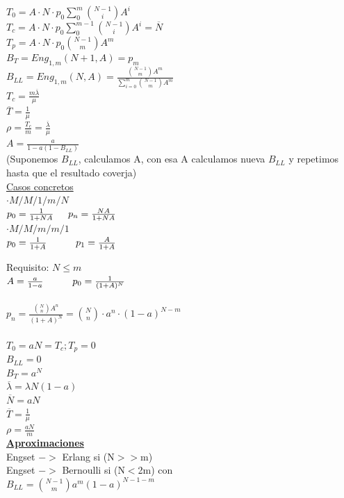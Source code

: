 \vfill\null
\columnbreak

\begin{minipage}{.22\textwidth}
	$T_0={A}\cdot{N}\cdot{p_0}\sum_0^m{\binom{N-1}{i}A^i}$ \\
	$T_c={A}\cdot{N}\cdot{p_0}\sum_0^{m-1}{\binom{N-1}{i}A^i}=\overline{N}$ \\
	$T_p={A}\cdot{N}\cdot{p_0}{\binom{N-1}{m}A^m}$ \\
	$B_{T}=Eng_{1,m}(N+1,A)=p_m$ \\
	$B_{LL}=Eng_{1,m}(N,A)=\frac{\binom{N-1}{m}A^m}{\sum\limits_{i=0}^m{\binom{N-1}{m}A^m}}$ \\
	$T_c=\frac{m{\overline{\lambda}}}{\mu}$ \\
	$\overline{T}=\frac{1}{\mu}$ \\
	$\rho=\frac{T_c}{m}=\frac{\overline{\lambda}}{\mu}$ \\
	$A=\frac{a}{1-a(1-B_{LL})}$ \\
	(Suponemos $B_{LL}$, calculamos A, con esa A calculamos nueva $B_{LL}$ y repetimos hasta que el resultado coverja) \\
	{\underline{Casos concretos}} \\
	$\cdot M/M/1/m/N$ \\
	$p_0=\frac{1}{1+NA} \hskip 1.5em p_n=\frac{NA}{1+NA}$ \\
	$\cdot M/M/m/m/1$ \\
	$p_0 = \frac{1}{1+A} \hskip 3em p_1=\frac{A}{1+A}$ \\
\end{minipage}

\begin{minipage}{.22\textwidth}
	Requisito: $N\le{m}$ \\
	$A=\frac{a}{1-a} \hskip 3em {p_0}=\frac{1}{(1+A)^N}$ \\ \\
	$p_n=\frac{\binom{N}{n}{A^n}}{(1+A)^N}=\binom{N}{n}\cdot{a^n}\cdot{(1-a)^{N-m}}$ \\ \\
	$T_0=aN=T_c;T_p=0$ \\
	$B_{LL}=0$ \\
	$B_{T}=a^N$ \\
	$\overline{\lambda}=\lambda{N}{(1-a)}$ \\
	$\overline{N}=a{N}$ \\
	$\overline{T}=\frac{1}{\mu}$ \\
	$\rho=\frac{aN}{m}$ \\
	{\bf \underline{Aproximaciones}} \\
	Engset $->$ Erlang si (N$>>$m) \\
	Engset $->$ Bernoulli si (N$<$2m) con \\
	$B_{LL}=\binom{N-1}{m}{a^m}{(1-a)^{N-1-m}}$ \\
\end{minipage}

